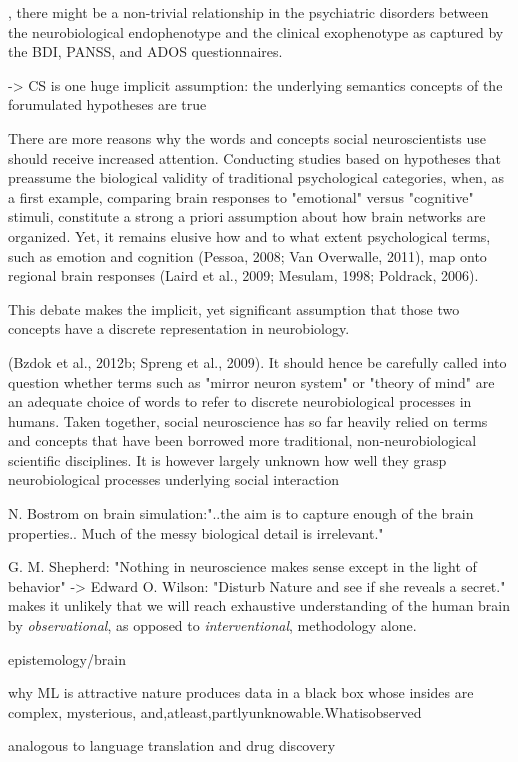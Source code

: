 \documentclass[authoryear,review,3p]{elsarticle}
\begin{document}
, there might be a non-trivial relationship in the psychiatric disorders between the neurobiological endophenotype and the clinical exophenotype as captured by the BDI, PANSS, and ADOS questionnaires.

-> CS is one huge implicit assumption:
the underlying semantics concepts of the forumulated hypotheses are true

There are more reasons why the words and concepts social neuroscientists use should receive increased attention. Conducting studies based on hypotheses that preassume the biological validity of traditional psychological categories, when, as a first example, comparing brain responses to "emotional" versus "cognitive" stimuli, constitute a strong a priori assumption about how brain networks are organized. Yet, it remains elusive how and to what extent psychological terms, such as emotion and cognition (Pessoa, 2008; Van Overwalle, 2011), map onto regional brain responses (Laird et al., 2009; Mesulam, 1998; Poldrack, 2006). 

This debate makes the implicit, yet significant assumption that those two concepts have a discrete representation in neurobiology. 

(Bzdok et al., 2012b; Spreng et al., 2009). It should hence be carefully called into question whether terms such as "mirror neuron system" or "theory of mind" are an adequate choice of words to refer to discrete neurobiological processes in humans. Taken together, social neuroscience has so far heavily relied on terms and concepts that have been borrowed more traditional, non-neurobiological scientific disciplines. It is however largely unknown how well they grasp neurobiological processes underlying social interaction


N. Bostrom on brain simulation:"..the aim is to capture enough of the brain properties.. Much of the messy biological detail is irrelevant."


G. M. Shepherd: "Nothing in neuroscience makes sense except in the light of behavior"
->
Edward O. Wilson: "Disturb Nature and see if she reveals a secret."
makes it unlikely that we will reach exhaustive understanding of
the human brain by
\textit{observational}, as opposed to \textit{interventional}, methodology
alone. 


epistemology/brain

why ML is attractive
nature produces data in a black box whose insides are complex, mysterious, and,atleast,partlyunknowable.Whatisobserved

analogous to language translation and drug discovery
\end{document}

